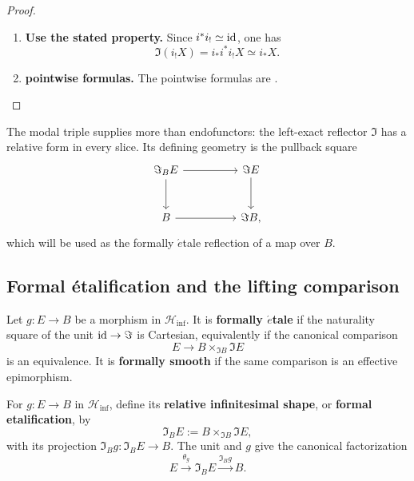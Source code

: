 \begin{proof}
\leavevmode
\begin{enumerate}[label=\textup{(\arabic*)}]
    \item \textbf{Use the stated property.}
    Since \(i^*i_!\simeq\operatorname{id}\), one has
    \[
        \Im(i_!X)=i_*i^*i_!X\simeq i_*X.
    \]

    \item \textbf{pointwise formulas.}
    The pointwise formulas are .
\end{enumerate}
\end{proof}
The modal triple supplies more than endofunctors: the left-exact reflector
\(\Im\) has a relative form in every slice. Its defining geometry is the
pullback square
\[
\begin{tikzcd}[column sep=huge,row sep=large]
\Im_B E \arrow[r] \arrow[d]
    & \Im E \arrow[d]
\\
B \arrow[r]
    & \Im B ,
\end{tikzcd}
\]
which will be used as the formally \(\acute{e}\)tale reflection of a map over
\(B\).

\subsection{Formal \texorpdfstring{\'etalification}{etalification} and the lifting comparison}

\begin{definition}
\label{def:infinitesimal-shape-etale}
Let \(g:E\to B\) be a morphism in \(\mathcal H_{\inf}\). It is
\textbf{formally \(\acute{e}\)tale} if the naturality square of the unit
\(\operatorname{id}\to\Im\) is Cartesian, equivalently if the canonical comparison
\[
    E\longrightarrow B\times_{\Im B}\Im E
\]
is an equivalence. It is \textbf{formally smooth} if the same comparison is an
effective epimorphism.
\end{definition}

\begin{construction}
\label{con:formal-etalification}
For \(g:E\to B\) in \(\mathcal H_{\inf}\), define its \textbf{relative
infinitesimal shape}, or \textbf{formal etalification}, by
\[
    \Im_B E
    :=
    B\times_{\Im B}\Im E,
\]
with its projection \(\Im_Bg:\Im_BE\to B\). The unit and \(g\) give the
canonical factorization
\[
    E\xrightarrow{\theta_g}\Im_BE\xrightarrow{\Im_Bg}B.
\]
\end{construction}

